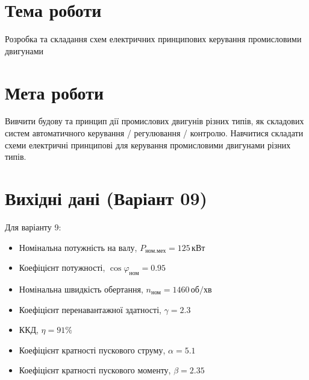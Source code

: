 \documentclass[a4paper]{article}
\begin{document}

    \section*{Тема роботи}
    Розробка та складання схем електричних принципових керування
    промисловими двигунами

    \section*{Мета роботи}
    Вивчити будову та принцип дії промислових двигунів
    різних типів, як складових систем автоматичного
    керування / регулювання / контролю. Навчитися складати схеми електричні
    принципові для керування промисловими двигунами різних типів.

    \section*{Вихідні дані (Варіант 09)}
Для варіанту 9:
\begin{itemize}
    \item Номінальна потужність на валу, \( P_{\text{ном.мех}} = 125 \, \text{кВт} \)
    \item Коефіцієнт потужності, \( \cos \varphi_{\text{ном}} = 0.95 \)
    \item Номінальна швидкість обертання, \( n_{\text{ном}} = 1460 \, \text{об/хв} \)
    \item Коефіцієнт перенавантажної здатності, \( \gamma = 2.3 \)
    \item ККД, \( \eta = 91\% \)
    \item Коефіцієнт кратності пускового струму, \( \alpha = 5.1 \)
    \item Коефіцієнт кратності пускового моменту, \( \beta = 2.35 \)
\end{itemize}

    \newpage 
    
\end{document}
